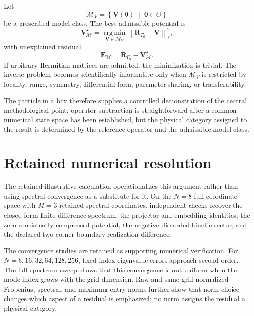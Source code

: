 Let
\begin{equation}
    \mathcal M_V
    =
    \left\{
        \mathbf V(\boldsymbol\theta)
        \;\middle|\;
        \boldsymbol\theta\in\Theta
    \right\}
\end{equation}
be a prescribed model class. The best admissible potential is
\begin{equation}
    \mathbf V_{\mathcal M}^{\star}
    =
    \operatorname*{arg\,min}_{\mathbf V\in\mathcal M_V}
    \left\lVert
        \mathbf R_{T_0}-\mathbf V
    \right\rVert_{\mathrm F}^2,
\end{equation}
with unexplained residual
\begin{equation}
    \mathbf E_{\mathcal M}
    =
    \mathbf R_{T_0}
    -
    \mathbf V_{\mathcal M}^{\star}.
\end{equation}
If arbitrary Hermitian matrices are admitted, the minimization is trivial. The
inverse problem becomes scientifically informative only when $\mathcal M_V$ is
restricted by locality, range, symmetry, differential form, parameter sharing,
or transferability.

The particle in a box therefore supplies a controlled demonstration of the
central methodological point: operator subtraction is straightforward after a
common numerical state space has been established, but the physical category
assigned to the result is determined by the reference operator and the
admissible model class.

\section{Retained numerical resolution}

The retained illustrative calculation operationalizes this argument rather than
using spectral convergence as a substitute for it. On the $N=8$ full coordinate
space with $M=3$ retained spectral coordinates, independent checks recover the
closed-form finite-difference spectrum, the projector and embedding identities,
the zero consistently compressed potential, the negative discarded kinetic
sector, and the declared two-corner boundary-realization difference.

The convergence studies are retained as supporting numerical verification. For
$N=8,16,32,64,128,256$, fixed-index eigenvalue errors approach second order.
The full-spectrum sweep shows that this convergence is not uniform when the mode
index grows with the grid dimension. Raw and same-grid-normalized Frobenius,
spectral, and maximum-entry norms further show that norm choice changes which
aspect of a residual is emphasized; no norm assigns the residual a physical
category.


